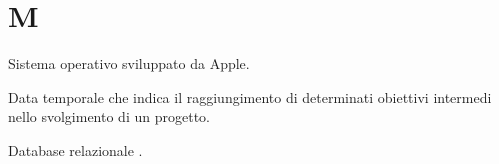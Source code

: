 \section{M}

Sistema operativo sviluppato da Apple.

Data temporale che indica il raggiungimento di determinati obiettivi intermedi nello svolgimento di un progetto. 

Database relazionale .
